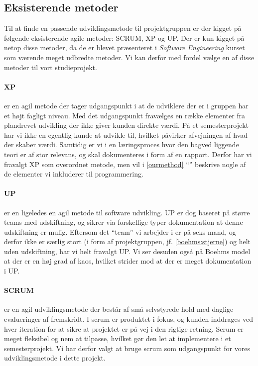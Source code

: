 \subsection{Eksisterende metoder}\label{existing}
Til at finde en passende udviklingsmetode til projektgruppen er der kigget på følgende eksisterende agile metoder: SCRUM, XP og UP.\cite{larman}
Der er kun kigget på netop disse metoder, da de er blevet præsenteret i \emph{Software Engineering} kurset som værende meget udbredte metoder.
Vi kan derfor med fordel vælge en af disse metoder til vort studieprojekt.


\paragraph{XP} er en agil metode der tager udgangspunkt i at de udviklere der er i gruppen har et højt fagligt niveau.
Med det udgangspunkt fravælges en række elementer fra plandrevet udvikling der ikke giver kunden direkte værdi.
På et semesterprojekt har vi ikke en egentlig kunde at udvikle til, hvilket påvirker afvejningen af hvad der skaber værdi.
Samtidig er vi i en læringsproces hvor den bagved liggende teori er af stor relevans, og skal dokumenteres i form af en rapport.
Derfor har vi fravalgt XP som overordnet metode, men vil i \cref{ourmethod} ``'' beskrive nogle af de elementer vi inkluderer til programmering.

\paragraph{UP} er en ligeledes en agil metode til software udvikling.
UP er dog baseret på større teams med udskiftning, og sikrer via forskellige typer dokumentation at denne udskiftning er mulig.
Eftersom det ``team'' vi arbejder i er på seks mand, og derfor ikke er særlig stort (i form af projektgruppen, jf. \cref{boehms:stjerne}) og helt uden udskiftning, har vi helt fravalgt UP.
Vi ser desuden også på Boehms model at der er en høj grad af kaos, hvilket strider mod at der er meget dokumentation i UP.

\paragraph{SCRUM} er en agil udviklingsmetode der består af små selvstyrede hold med daglige evalueringer af fremskridt. 
I scrum er produktet i fokus, og kunden inddrages ved hver iteration for at sikre at projektet er på vej i den rigtige retning. Scrum er meget fleksibel og nem at tilpasse, hvilket gør den let at implementere i et semesterprojekt. 
Vi har derfor valgt at bruge scrum som udgangspunkt for vores udviklingsmetode i dette projekt.
